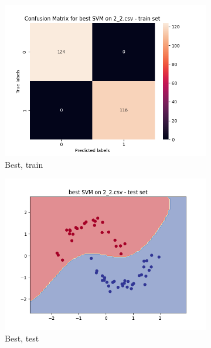 \documentclass[12pt]{article}
\newcommand*{\subfigwidth}{0.24\textwidth}
\begin{document}
\begin{figure}[H]
\begin{subfigure}[t]{\subfigwidth}
        \includegraphics[width=\linewidth]{img/exp_2/svm/2_2/best/train_matrix.png}
        \caption{Best, train}
    \end{subfigure}
    \hfill
    \begin{subfigure}[t]{\subfigwidth}
        \includegraphics[width=\linewidth]{img/exp_2/svm/2_2/best/test_boundary.png}
        \caption{Best, test}
    \end{subfigure}
    \hfill
    \begin{subfigure}[t]{\subfigwidth}

\end{subfigure}
\end{figure}
\end{document}
